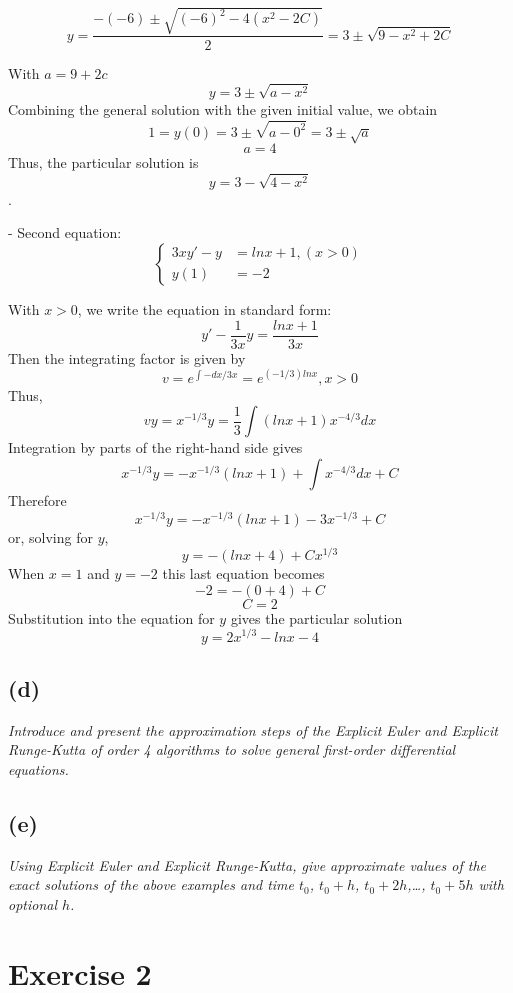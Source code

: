 \documentclass[a4paper]{article}
\begin{document}
\[y = \frac{-(-6) \pm \sqrt{(-6)^2 - 4(x^2 - 2C)}}{2} = 3 \pm \sqrt{9 - x^2 + 2C}\]

With \(a = 9 + 2c\)
\[y = 3 \pm \sqrt{a - x^2}\]
Combining the general solution with the given initial value, we obtain
\[1 = y(0) = 3 \pm \sqrt{a - 0^2} = 3 \pm \sqrt{a}\]
\[a = 4\]
Thus, the particular solution is
\[y = 3 - \sqrt{4-x^2}\].


- Second equation:
\begin{equation*}
  \begin{cases}
    3xy' - y & = lnx + 1, (x > 0) \\
    y(1)     & = -2
  \end{cases}
\end{equation*}

With \(x > 0\), we write the equation in standard form:
\[y' - \frac{1}{3x}y = \frac{lnx + 1}{3x}\]
Then the integrating factor is given by
\[v = e^{\int-dx/3x} = e^{(-1/3)lnx} , x > 0\]
Thus,
\[vy = x^{-1/3} y = \frac{1}{3} \int(lnx + 1) x^{-4/3} dx\]
Integration by parts of the right-hand side gives
\[x^{-1/3}y = -x^{-1/3}(lnx+1) + \int x^{-4/3}dx + C\]
Therefore
\[x^{-1/3}y = -x^{-1/3}(lnx+1) - 3x^{-1/3} + C\]
or, solving for \(y\),
\[y = -(lnx + 4) + Cx^{1/3}\]
When \(x = 1\) and \(y = -2\) this last equation becomes
\[-2 = -(0+4) + C\]
\[C = 2\]
Substitution into the equation for \(y\) gives the particular solution
\[y = 2x^{1/3} - lnx - 4\]



\subsection{(d)}
\textit{Introduce and present the approximation steps of the Explicit Euler and Explicit Runge-Kutta of order 4 algorithms to solve general first-order differential equations.}



\subsection{(e)}
\textit{Using Explicit Euler and Explicit Runge-Kutta, give approximate values of the exact solutions of the above examples and time \(t_0\), \(t_0 + h\), \(t_0 + 2h\),\dots, \(t_0 + 5h\) with optional \(h\).}




\newpage
\section{Exercise 2}
\end{document}
